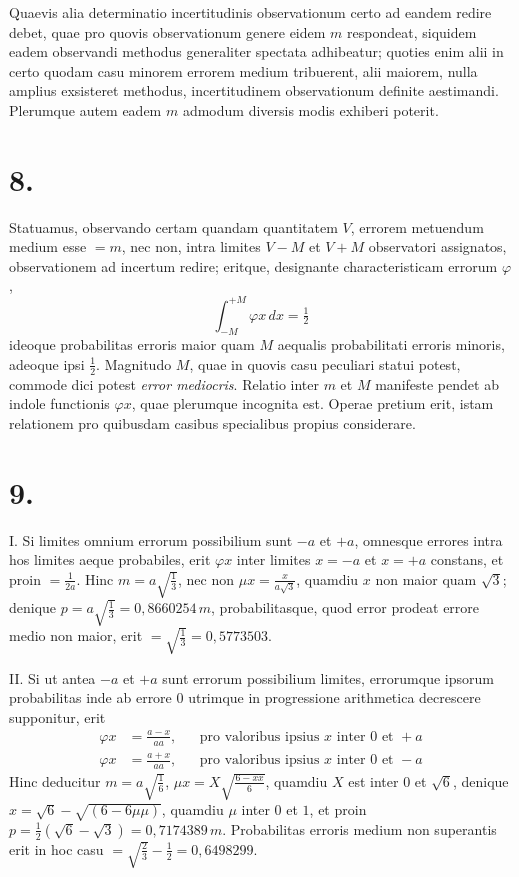 \documentclass[12pt,a4paper]{book}
\begin{document}
Quaevis alia determinatio incertitudinis observationum certo ad eandem redire debet, quae pro quovis observationum genere eidem $m$ respondeat, siquidem eadem observandi methodus generaliter spectata adhibeatur; quoties enim alii in certo quodam casu minorem errorem medium tribuerent, alii maiorem, nulla amplius exsisteret methodus, incertitudinem observationum definite aestimandi. Plerumque autem eadem $m$ admodum diversis modis exhiberi poterit.

\section*{8.}
\label{sec:art8}

Statuamus, observando certam quandam quantitatem $V$, errorem metuendum medium esse $=m$, nec non, intra limites $V-M$ et $V+M$ observatori assignatos, observationem ad incertum redire; eritque, designante characteristicam errorum $\varphi$,
%
\begin{equation*}
\int_{-M}^{+M}\varphi x\,dx = \tfrac{1}{2}
\end{equation*}
ideoque probabilitas erroris maior quam $M$ aequalis probabilitati erroris minoris, adeoque ipsi $\tfrac{1}{2}$. Magnitudo $M$, quae in quovis casu peculiari statui potest, commode dici potest \textit{error mediocris}. Relatio inter $m$ et $M$ manifeste pendet ab indole functionis $\varphi x$, quae plerumque incognita est. Operae pretium erit, istam relationem pro quibusdam casibus specialibus propius considerare.

\section*{9.}
\label{sec:art9}

\textsc{I.} Si limites omnium errorum possibilium sunt $-a$ et $+a$, omnesque errores intra hos limites aeque probabiles, erit $\varphi x$ inter limites $x=-a$ et $x=+a$ constans, et proin $=\tfrac{1}{2a}$. Hinc $m=a\sqrt{\tfrac{1}{3}}$, nec non $\mu x=\tfrac{x}{a\sqrt{3}}$, quamdiu $x$ non maior quam $\sqrt{3}$; denique $p=a\sqrt{\tfrac{1}{3}}=0{,}8660254\,m$, probabilitasque, quod error prodeat errore medio non maior, erit $=\sqrt{\tfrac{1}{3}}=0{,}5773503$.

\textsc{II.} Si ut antea $-a$ et $+a$ sunt errorum possibilium limites, errorumque ipsorum probabilitas inde ab errore $0$ utrimque in progressione arithmetica decrescere supponitur, erit
%
\begin{align*}
\varphi x &= \tfrac{a-x}{aa}, &&\text{pro valoribus ipsius }x\text{ inter }0\text{ et }+a\\
\varphi x &= \tfrac{a+x}{aa}, &&\text{pro valoribus ipsius }x\text{ inter }0\text{ et }-a
\end{align*}
Hinc deducitur $m=a\sqrt{\tfrac{1}{6}}$, $\mu x=X\sqrt{\tfrac{6-xx}{6}}$, quamdiu $X$ est inter $0$ et $\sqrt{6}$, denique $x=\sqrt{6}-\sqrt{(6-6\mu\mu)}$, quamdiu $\mu$ inter $0$ et $1$, et proin $p=\tfrac{1}{2}(\sqrt{6}-\sqrt{3})=0{,}7174389\,m$. Probabilitas erroris medium non superantis erit in hoc casu $=\sqrt{\tfrac{2}{3}}-\tfrac{1}{2}=0{,}6498299$.
\end{document}
